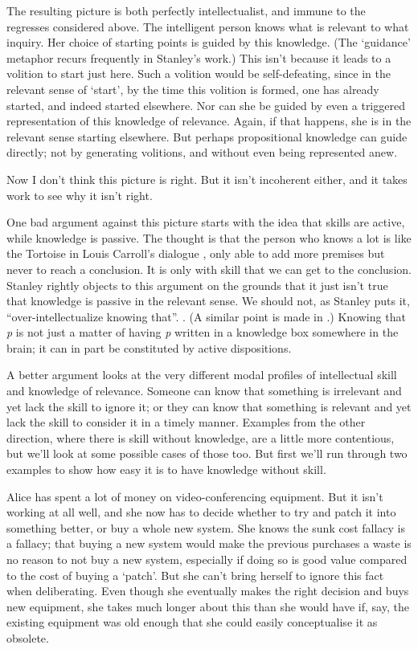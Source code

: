 The resulting picture is both perfectly intellectualist, and immune to the regresses considered above. The intelligent person knows what is relevant to what inquiry. Her choice of starting points is guided by this knowledge. (The `guidance' metaphor recurs frequently in Stanley's work.) This isn't because it leads to a volition to start just here. Such a volition would be self-defeating, since in the relevant sense of `start', by the time this volition is formed, one has already started, and indeed started elsewhere. Nor can she be guided by even a triggered representation of this knowledge of relevance. Again, if that happens, she is in the relevant sense starting elsewhere. But perhaps propositional knowledge can guide directly; not by generating volitions, and without even being represented anew.

Now I don't think this picture is right. But it isn't incoherent either, and it takes work to see why it isn't right.

One bad argument against this picture starts with the idea that skills are active, while knowledge is passive. The thought is that the person who knows a lot is like the Tortoise in Louis Carroll's dialogue \citep{Carroll1895}, only able to add more premises but never to reach a conclusion. It is only with skill that we can get to the conclusion. Stanley rightly objects to this argument on the grounds that it just isn't true that knowledge is passive in the relevant sense. We should not, as Stanley puts it, ``over-intellectualize knowing that''. \cite[p. 773]{Stanley2012-Replies}. (A similar point is made in \citet{Stalnaker2012}.) Knowing that \emph{p} is not just a matter of having \emph{p} written in a knowledge box somewhere in the brain; it can in part be constituted by active dispositions.

A better argument looks at the very different modal profiles of intellectual skill and knowledge of relevance. Someone can know that something is irrelevant and yet lack the skill to ignore it; or they can know that something is relevant and yet lack the skill to consider it in a timely manner. Examples from the other direction, where there is skill without knowledge, are a little more contentious, but we'll look at some possible cases of those too. But first we'll run through two examples to show how easy it is to have knowledge without skill.

Alice has spent a lot of money on video-conferencing equipment. But it isn't working at all well, and she now has to decide whether to try and patch it into something better, or buy a whole new system. She knows the sunk cost fallacy is a fallacy; that buying a new system would make the previous purchases a waste is no reason to not buy a new system, especially if doing so is good value compared to the cost of buying a `patch'. But she can't bring herself to ignore this fact when deliberating. Even though she eventually makes the right decision and buys new equipment, she takes much longer about this than she would have if, say, the existing equipment was old enough that she could easily conceptualise it as obsolete.

